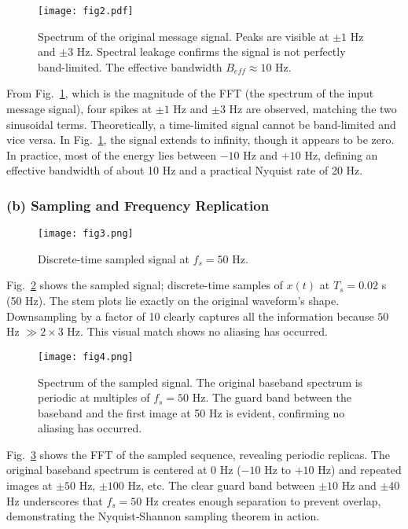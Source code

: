 \documentclass[conference]{IEEEtran}
\begin{document}
\begin{figure}[H]
    \centering
    \texttt{[image: fig2.pdf]}
    \caption{Spectrum of the original message signal. Peaks are visible at $\pm1$ Hz and $\pm3$ Hz. Spectral leakage confirms the signal is not perfectly band-limited. The effective bandwidth $B_{eff} \approx 10$ Hz.}
    \label{fig:original_spectrum}
\end{figure}

From Fig.~\ref{fig:original_spectrum}, which is the magnitude of the FFT (the spectrum of the input message signal), four spikes at $\pm1$ Hz and $\pm3$ Hz are observed, matching the two sinusoidal terms. Theoretically, a time-limited signal cannot be band-limited and vice versa. In Fig.~\ref{fig:original_spectrum}, the signal extends to infinity, though it appears to be zero. In practice, most of the energy lies between $-10$ Hz and $+10$ Hz, defining an effective bandwidth of about 10 Hz and a practical Nyquist rate of 20 Hz.

\subsubsection{(b) Sampling and Frequency Replication}

\begin{figure}[H]
    \centering
    \texttt{[image: fig3.png]}
    \caption{Discrete-time sampled signal at $f_s = 50$ Hz.}
    \label{fig:sampled_signal}
\end{figure}

Fig.~\ref{fig:sampled_signal} shows the sampled signal; discrete-time samples of $x(t)$ at $T_s = 0.02$ s (50 Hz). The stem plots lie exactly on the original waveform's shape. Downsampling by a factor of 10 clearly captures all the information because $50$ Hz $\gg 2 \times 3$ Hz. This visual match shows no aliasing has occurred.

\begin{figure}[H]
    \centering
    \texttt{[image: fig4.png]}
    \caption{Spectrum of the sampled signal. The original baseband spectrum is periodic at multiples of $f_s = 50$ Hz. The guard band between the baseband and the first image at 50 Hz is evident, confirming no aliasing has occurred.}
    \label{fig:sampled_spectrum}
\end{figure}

Fig.~\ref{fig:sampled_spectrum} shows the FFT of the sampled sequence, revealing periodic replicas. The original baseband spectrum is centered at 0 Hz ($-10$ Hz to $+10$ Hz) and repeated images at $\pm50$ Hz, $\pm100$ Hz, etc. The clear guard band between $\pm10$ Hz and $\pm40$ Hz underscores that $f_s = 50$ Hz creates enough separation to prevent overlap, demonstrating the Nyquist‐Shannon sampling theorem in action.
\end{document}

